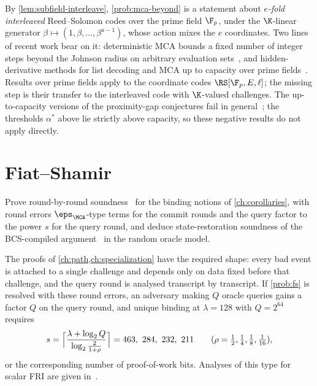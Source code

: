 By \cref{lem:subfield-interleave}, \cref{prob:mca-beyond} is a statement about
\emph{$e$-fold interleaved} Reed--Solomon codes over the prime field $\F_p$, under the
$\K$-linear generator $\beta\mapsto(1,\beta,\dots,\beta^{a-1})$, whose action mixes the
$e$ coordinates. Two lines of recent work bear on it: deterministic MCA bounds a fixed
number of integer steps beyond the Johnson radius on arbitrary evaluation
sets~\cite{Jo26}, and hidden-derivative methods for list decoding and MCA up to capacity
over prime fields~\cite{DKT26,Jer26}. Results over prime fields apply to the coordinate
codes $\RS[\F_p,E,\ell]$; the missing step is their transfer to the interleaved code with
$\K$-valued challenges. The up-to-capacity versions of the proximity-gap conjectures fail
in general~\cite{BCHKS25}; the thresholds $\alpha^\ast$ above lie strictly above
capacity, so these negative results do not apply directly.

\section{Fiat--Shamir}

\begin{problem}\label{prob:fs}
Prove round-by-round soundness~\cite{CCHLRRW19} for the binding notions of
\cref{ch:corollaries}, with round errors $\eps_{\MCA}$-type terms for the commit rounds
and the query factor to the power $s$ for the query round, and deduce state-restoration
soundness of the BCS-compiled argument~\cite{BCS16} in the random oracle model.
\end{problem}

The proofs of \cref{ch:path,ch:specialization} have the required shape: every bad event
is attached to a single challenge and depends only on data fixed before that challenge,
and the query round is analysed transcript by transcript. If \cref{prob:fs} is resolved
with these round errors, an adversary making $Q$ oracle queries gains a factor $Q$ on the
query round, and unique binding at $\lambda=128$ with $Q=2^{64}$ requires
\[
s=\Bigl\lceil\frac{\lambda+\log_2Q}{\log_2\frac2{1+\rho}}\Bigr\rceil
=463,\ 284,\ 232,\ 211\qquad(\rho=\tfrac12,\tfrac14,\tfrac18,\tfrac1{16}),
\]
or the corresponding number of proof-of-work bits. Analyses of this type for scalar FRI
are given in~\cite{BGKTTZ23}.

